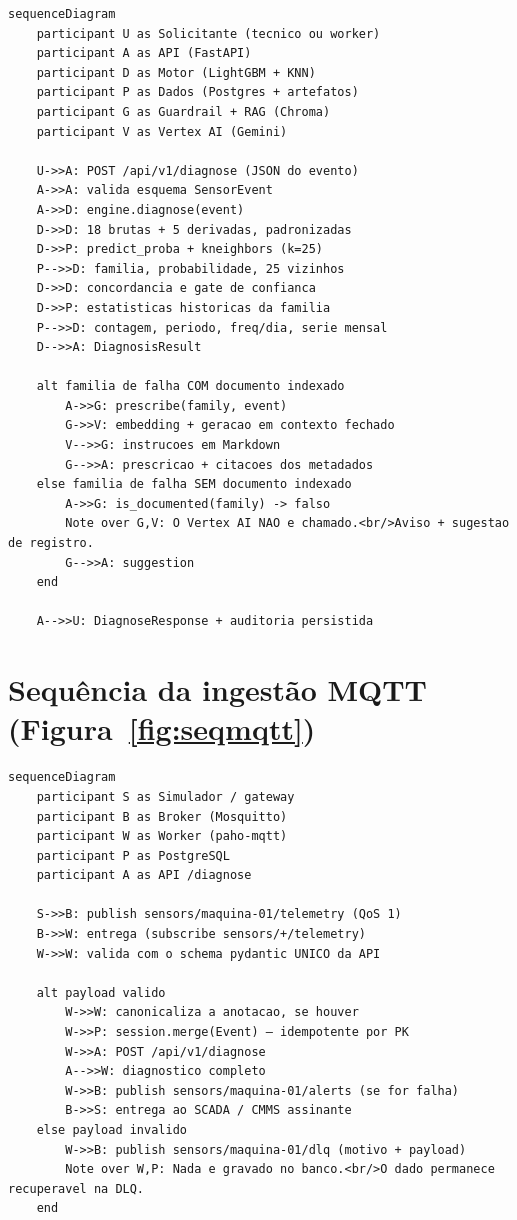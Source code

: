 \begin{lstlisting}[language=mermaid, caption={Sequência do diagnóstico completo}, label={lst:mmseqdiag}]
sequenceDiagram
    participant U as Solicitante (tecnico ou worker)
    participant A as API (FastAPI)
    participant D as Motor (LightGBM + KNN)
    participant P as Dados (Postgres + artefatos)
    participant G as Guardrail + RAG (Chroma)
    participant V as Vertex AI (Gemini)

    U->>A: POST /api/v1/diagnose (JSON do evento)
    A->>A: valida esquema SensorEvent
    A->>D: engine.diagnose(event)
    D->>D: 18 brutas + 5 derivadas, padronizadas
    D->>P: predict_proba + kneighbors (k=25)
    P-->>D: familia, probabilidade, 25 vizinhos
    D->>D: concordancia e gate de confianca
    D->>P: estatisticas historicas da familia
    P-->>D: contagem, periodo, freq/dia, serie mensal
    D-->>A: DiagnosisResult

    alt familia de falha COM documento indexado
        A->>G: prescribe(family, event)
        G->>V: embedding + geracao em contexto fechado
        V-->>G: instrucoes em Markdown
        G-->>A: prescricao + citacoes dos metadados
    else familia de falha SEM documento indexado
        A->>G: is_documented(family) -> falso
        Note over G,V: O Vertex AI NAO e chamado.<br/>Aviso + sugestao de registro.
        G-->>A: suggestion
    end

    A-->>U: DiagnoseResponse + auditoria persistida
\end{lstlisting}

\section{Sequência da ingestão MQTT (Figura~\ref{fig:seqmqtt})}

\begin{lstlisting}[language=mermaid, caption={Sequência da ingestão industrial}, label={lst:mmseqmqtt}]
sequenceDiagram
    participant S as Simulador / gateway
    participant B as Broker (Mosquitto)
    participant W as Worker (paho-mqtt)
    participant P as PostgreSQL
    participant A as API /diagnose

    S->>B: publish sensors/maquina-01/telemetry (QoS 1)
    B->>W: entrega (subscribe sensors/+/telemetry)
    W->>W: valida com o schema pydantic UNICO da API

    alt payload valido
        W->>W: canonicaliza a anotacao, se houver
        W->>P: session.merge(Event) — idempotente por PK
        W->>A: POST /api/v1/diagnose
        A-->>W: diagnostico completo
        W->>B: publish sensors/maquina-01/alerts (se for falha)
        B->>S: entrega ao SCADA / CMMS assinante
    else payload invalido
        W->>B: publish sensors/maquina-01/dlq (motivo + payload)
        Note over W,P: Nada e gravado no banco.<br/>O dado permanece recuperavel na DLQ.
    end
\end{lstlisting}

